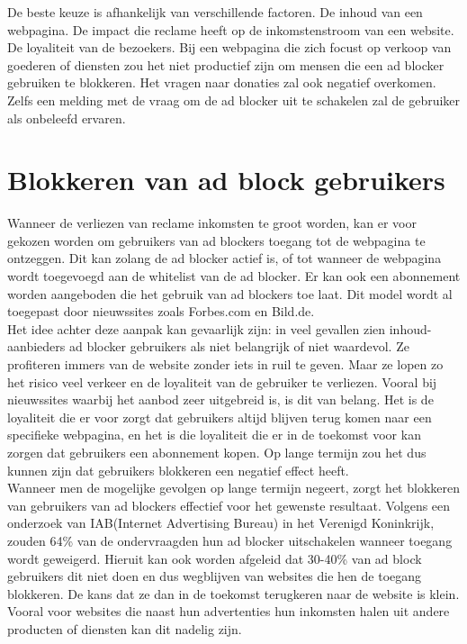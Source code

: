 \documentclass[pdftex,a4paper,12pt,twoside]{report}
\begin{document}
De beste keuze is afhankelijk van verschillende factoren. De inhoud van een webpagina. De impact die reclame heeft op de inkomstenstroom van een website. De loyaliteit van de bezoekers. Bij een webpagina die zich focust op verkoop van goederen of diensten zou het niet productief zijn om mensen die een ad blocker gebruiken te blokkeren. Het vragen naar donaties zal ook negatief overkomen. Zelfs een melding met de vraag om de ad blocker uit te schakelen zal de gebruiker als onbeleefd ervaren.

\section{Blokkeren van ad block gebruikers}
\label{sec Blokkeren van ad block gebruikers}
Wanneer de verliezen van reclame inkomsten te groot worden, kan er voor gekozen worden om gebruikers van ad blockers toegang tot de webpagina te ontzeggen. Dit kan zolang de ad blocker actief is, of tot wanneer de webpagina wordt toegevoegd aan de whitelist van de ad blocker. Er kan ook een abonnement worden aangeboden die het gebruik van ad blockers toe laat. Dit model wordt al toegepast door nieuwssites zoals Forbes.com en Bild.de.
\\
Het idee achter deze aanpak kan gevaarlijk zijn: in veel gevallen zien inhoud-aanbieders ad blocker gebruikers als niet belangrijk of niet waardevol. Ze profiteren immers van de website zonder iets in ruil te geven. Maar ze lopen zo het risico veel verkeer en de loyaliteit van de gebruiker te verliezen. Vooral bij nieuwssites waarbij het aanbod zeer uitgebreid is, is dit van belang. Het is de loyaliteit die er voor zorgt dat gebruikers altijd blijven terug komen naar een specifieke webpagina, en het is die loyaliteit die er in de toekomst voor kan zorgen dat gebruikers een abonnement kopen. Op lange termijn zou het dus kunnen zijn dat gebruikers blokkeren een negatief effect heeft.
\\
Wanneer men de mogelijke gevolgen op lange termijn negeert, zorgt het blokkeren van gebruikers van ad blockers effectief voor het gewenste resultaat. Volgens een onderzoek van IAB(Internet Advertising Bureau) in het Verenigd Koninkrijk, zouden 64\% van de ondervraagden hun ad blocker uitschakelen wanneer toegang wordt geweigerd. Hieruit kan ook worden afgeleid dat 30-40\% van ad block gebruikers dit niet doen en dus wegblijven van websites die hen de toegang blokkeren. De kans dat ze dan in de toekomst terugkeren naar de website is klein. Vooral voor websites die naast hun advertenties hun inkomsten halen uit andere producten of diensten kan dit nadelig zijn.
\end{document}
